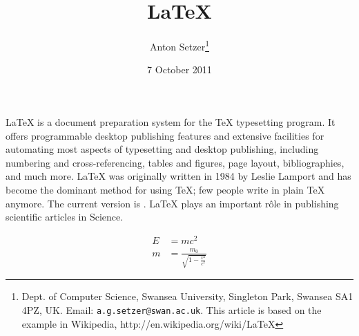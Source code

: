 \documentclass[12pt]{article}
\title{\LaTeX}
\author{Anton Setzer\thanks{Dept. of Computer Science, Swansea University, Singleton Park, Swansea SA1 4PZ, UK. Email: {\tt a.g.setzer@swan.ac.uk}. This article is based on the example in Wikipedia, 
http://en.wikipedia.org/wiki/LaTeX}}
\date{7 October 2011}
\newcommand{\role}{{r\^{o}le}}
\begin{document}
  \maketitle
  \LaTeX{} is a document preparation system for the \TeX{}
  typesetting program. It offers programmable desktop publishing
  features and extensive facilities for automating most aspects of
  typesetting and desktop publishing, including numbering and
  cross-referencing, tables and figures, page layout, bibliographies,
  and much more. \LaTeX{} was originally written in 1984 by Leslie
  Lamport and has become the dominant method for using \TeX; few
  people write in plain \TeX{} anymore. The current version  is
  \LaTeXe. \LaTeX{} plays an important \role{} in publishing scientific
  articles in Science.
 
  \begin{align}
    E &= mc^2                              \\
    m &= \frac{m_0}{\sqrt{1-\frac{v^2}{c^2}}}
  \end{align}
\end{document}
